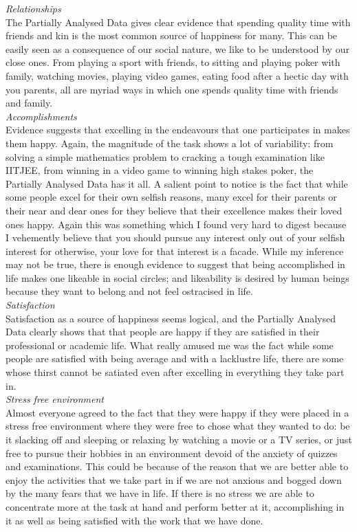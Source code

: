 \documentclass[twoside]{article}
\newcommand{\pad}{Partially Analysed Data }
\begin{document}
\begin{multicols}{2}
\noindent \emph{Relationships}\\
The \pad gives clear evidence that spending quality time with friends and kin is the most common source of
happiness for many. This can be easily seen as a consequence of our social nature, we like to be understood
by our close ones. From playing a sport with friends, to sitting and playing poker with family, watching movies,
playing video games, eating food after a hectic day with you parents, all are myriad ways in which one spends
quality time with friends and family.\\

\noindent \emph{Accomplishments}\\
Evidence suggests that excelling in the endeavours that one participates in makes them happy. Again, the
magnitude of the task shows a lot of variability: from solving a simple mathematics problem to
cracking a tough examination like IITJEE, from winning in a video game to winning high stakes poker, the \pad 
has it all.
A salient point to notice is the fact that while some people excel for their own selfish reasons, many excel 
for their parents or their near and dear ones for they believe that their excellence makes their loved ones 
happy. Again this was something which I found very hard to digest because I vehemently believe that you
should pursue any interest only out of your selfish interest for otherwise, your love for that interest is a 
facade.
While my inference may not be true, there is enough evidence to suggest that being accomplished in life
makes one likeable in social circles; and likeability is desired by human beings because they want to belong and
not feel ostracised in life.\\

\noindent \emph{Satisfaction}\\
Satisfaction as a source of happiness seems logical, and the \pad clearly shows that that people are happy
if they are satisfied in their professional or academic life. What really amused me was the fact
while some people are satisfied with being average and with a lacklustre life, there are some whose thirst
cannot be satiated even after excelling in everything they take part in. \\

\noindent \emph{Stress free environment}\\
Almost everyone agreed to the fact that they were happy if they were placed in a stress
free environment where they were free to chose what they wanted to do: be it slacking off and sleeping or 
relaxing by watching a movie or a TV series, or just free to pursue their hobbies in an environment
devoid of the anxiety of quizzes and examinations. 
This could be because of the reason that we are better able to enjoy the activities that we take part
in if we are not anxious and bogged down by the many fears that we have in life. If there is no stress
we are able to concentrate more at the task at hand and perform better at it, accomplishing in it as
well as being satisfied with the work that we have done.


\end{multicols}
\end{document}
